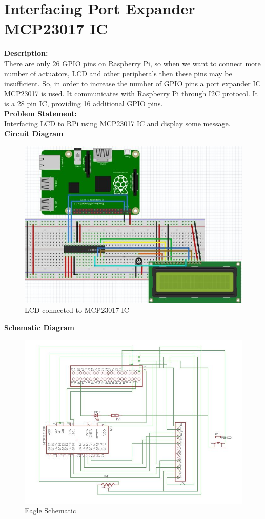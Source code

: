 \documentclass[a4paper,12pt,oneside]{book}
\begin{document}
\section{Interfacing Port Expander MCP23017 IC}
\textbf{Description:}\\
There are only 26 GPIO pins on Raspberry Pi, so when we want to connect more number of actuators, LCD and other peripherals then these pins may be insufficient. So, in order to increase the number of GPIO pins a port expander IC MCP23017 is used. It communicates with Raspberry Pi through I2C protocol. It is a 28 pin IC, providing 16 additional GPIO pins.  \\
\textbf{Problem Statement:} \\
Interfacing LCD to RPi using MCP23017 IC and display some message.\\
\textbf{Circuit Diagram}\\
\begin{figure}[H]
    \centering
    \includegraphics[scale=0.4]{port_expander_lcd}
    \caption{LCD connected to MCP23017 IC}
\end{figure}
\newpage
\textbf{Schematic Diagram}\\
\begin{figure}[H]
    \centering
    \includegraphics[scale= 0.8]{LCD_schematic}
    \caption{Eagle Schematic}
\end{figure}
\end{document}
